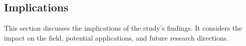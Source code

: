 \subsection{Implications}

This section discusses the implications of the study's findings. It considers the impact on the field, potential applications, and future research directions.